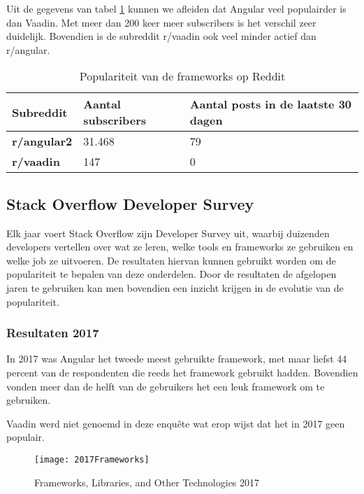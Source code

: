 Uit de gegevens van tabel \ref{table:reddit} kunnen we afleiden dat Angular veel populairder is dan Vaadin. Met meer dan 200 keer meer subscribers is het verschil zeer duidelijk. Bovendien is de subreddit r/vaadin ook veel minder actief dan r/angular.
\begin{table}[H]
	\begin{tabular}{|l|l|l|}
		\hline
		\textbf{Subreddit}  & \textbf{Aantal subscribers} & \textbf{Aantal posts in de laatste 30 dagen} \\ \hline
		\textbf{r/angular2} & 31.468                      & 79                                           \\ \hline
		\textbf{r/vaadin}   & 147                         & 0                                            \\ \hline
	\end{tabular}
	\caption{Populariteit van de frameworks op Reddit}
\label{table:reddit}
\end{table}

\subsection{Stack Overflow Developer Survey}
Elk jaar voert Stack Overflow zijn Developer Survey \autocite{DeveloperSurvey2019} uit, waarbij duizenden developers vertellen over wat ze leren, welke tools en frameworks ze gebruiken en welke job ze uitvoeren. De resultaten hiervan kunnen gebruikt worden om de populariteit te bepalen van deze onderdelen. Door de resultaten de afgelopen jaren te gebruiken kan men bovendien een inzicht krijgen in de evolutie van de populariteit.


\subsubsection{Resultaten 2017}
In 2017 was Angular het tweede meest gebruikte framework, met maar liefst 44 percent van de respondenten die reeds het framework gebruikt hadden. Bovendien vonden meer dan de helft van de gebruikers het een leuk framework om te gebruiken.

Vaadin werd niet genoemd in deze enquête wat erop wijst dat het in 2017 geen populair.

\begin{figure}[H]
	\centering
	\texttt{[image: 2017Frameworks]}
	\caption{Frameworks, Libraries, and Other Technologies 2017 \autocite{DeveloperSurvey2017}}
	\label{fig:Frameworks, Libraries, and Other Technologies 2017}
\end{figure}

